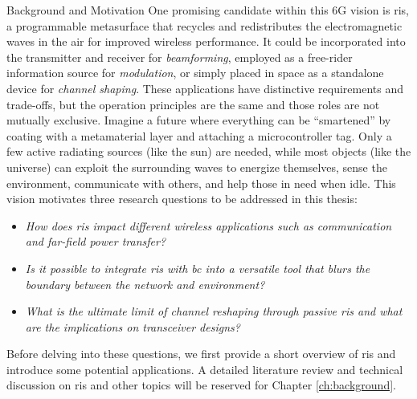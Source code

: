 \begin{section}{Background and Motivation}
	One promising candidate within this 6G vision is \gls{ris}, a programmable metasurface that recycles and redistributes the electromagnetic waves in the air for improved wireless performance.
	It could be incorporated into the transmitter and receiver for \emph{beamforming}, employed as a free-rider information source for \emph{modulation}, or simply placed in space as a standalone device for \emph{channel shaping}.
	These applications have distinctive requirements and trade-offs, but the operation principles are the same and those roles are not mutually exclusive.
	Imagine a future where everything can be ``smartened'' by coating with a metamaterial layer and attaching a microcontroller tag.
	Only a few active radiating sources (like the sun) are needed, while most objects (like the universe) can exploit the surrounding waves to energize themselves, sense the environment, communicate with others, and help those in need when idle.
	This vision motivates three research questions to be addressed in this thesis:
	\begin{itemize}
		\item \emph{How does \gls{ris} impact different wireless applications such as communication and far-field power transfer?}
		\item \emph{Is it possible to integrate \gls{ris} with \gls{bc} into a versatile tool that blurs the boundary between the network and environment?}
		\item \emph{What is the ultimate limit of channel reshaping through passive \gls{ris} and what are the implications on transceiver designs?}
	\end{itemize}

	Before delving into these questions, we first provide a short overview of \gls{ris} and introduce some potential applications.
	A detailed literature review and technical discussion on \gls{ris} and other topics will be reserved for Chapter \ref{ch:background}.
\end{section}

